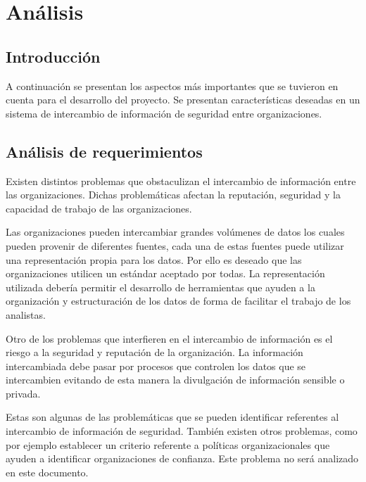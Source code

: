 \setlength\tabcolsep{1mm}
\renewcommand\arraystretch{1.3}
\renewcommand\theFigura{\arabic{Figura}}
\renewcommand\theTabla{\arabic{Tabla}}

\chapter{Análisis}
\label{capitulo2}
	
\section{Introducción}
{
	A continuación se presentan los aspectos más importantes que se tuvieron en cuenta para el desarrollo del proyecto. Se
	presentan características deseadas en un sistema de intercambio de información de seguridad entre organizaciones.}

\section{Análisis de requerimientos}
{
	Existen distintos problemas que obstaculizan el intercambio de información entre las organizaciones. Dichas
	problemáticas afectan la reputación, seguridad y la capacidad de trabajo de las organizaciones. }

{
	Las organizaciones pueden intercambiar grandes volúmenes de datos los cuales pueden provenir de diferentes fuentes, cada
	una de estas fuentes puede utilizar una representación propia para los datos. Por ello es deseado que las
	organizaciones utilicen un estándar aceptado por todas. La representación utilizada debería permitir el desarrollo de
	herramientas que ayuden a la organización y estructuración de los datos de forma de facilitar el trabajo de los
	analistas.}

{
	Otro de los problemas que interfieren en el intercambio de información es el riesgo a la seguridad y reputación de la
	organización. La información intercambiada debe pasar por procesos que controlen los datos que se intercambien evitando
	de esta manera la divulgación de información sensible o privada.}

{
	Estas son algunas de las problemáticas que se pueden identificar referentes al intercambio de información de seguridad.
	También existen otros problemas, como por ejemplo establecer un criterio referente a políticas organizacionales que
	ayuden a identificar organizaciones de confianza. Este problema no será analizado en este documento. }


